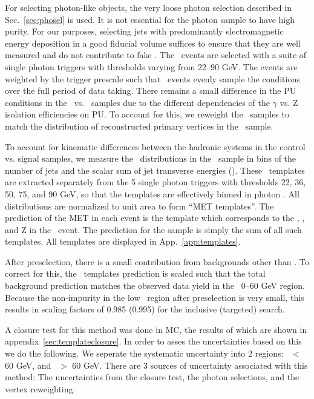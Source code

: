 For selecting photon-like objects, the very loose photon selection described in Sec.~\ref{sec:phosel} is used.
It is not essential for the photon sample to have high purity. For our purposes, selecting jets with predominantly 
electromagnetic energy deposition in a good fiducial volume suffices to ensure that 
they are well measured and do not contribute to fake \MET. The \gjets\ events are selected with a suite of
single photon triggers with \pt thresholds varying from 22--90 GeV. The events are weighted by the trigger prescale
such that \gjets\ events evenly sample the conditions over the full period of data taking.
There remains a small difference in the PU conditions in the \gjets\ vs. \zjets\ samples due to the different
dependencies of the $\gamma$ vs. Z isolation efficiencies on PU. To account for this, we reweight the \gjets\ samples
to match the distribution of reconstructed primary vertices in the \zjets\ sample.

To account for kinematic differences between the hadronic systems in the control vs. signal 
samples, we measure the \MET\ distributions in the \gjets\ sample in bins of the number of jets 
and the scalar sum of jet transverse energies (\Ht). These \MET\ templates are extracted separately from the 5 single photon
triggers with thresholds 22, 36, 50, 75, and 90 GeV, so that the templates are effectively binned in photon \pt.
All \MET distributions are normalized to unit area to form ``MET templates''.
The prediction of the MET in each \Z event is the template which corresponds to the \njets,
\Ht, and Z \pt in the \zjets\ event. The prediction for the \Z sample is simply the sum of all such templates.
All templates are displayed in App.~\ref{app:templates}.

After preselection, there is  a small contribution from backgrounds other than \zjets. To correct for this, the \MET\ templates
prediction is scaled such that the total background prediction matches the observed data yield in the \MET\ 0--60 GeV region.
Because the non-\zjets impurity in the low \MET\ region after preselection is very small, this results in 
scaling factors of 0.985 (0.995) for the inclusive (targeted) search.

A closure test for this method was done in MC, the results of which are shown in appendix~\ref{sec:templateclosure}.
In order to asses the uncertainties based on this we do the following. We seperate the systematic uncertainty 
into 2 regions: \MET\ $<$ 60 GeV, and \MET\ $>$ 60 GeV. There are 3 sources of uncertainty associated with this method:
The uncertainties from the closure test, the photon selections, and the vertex reweighting.

